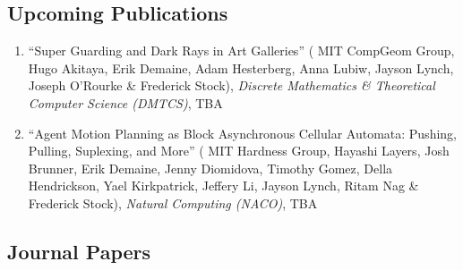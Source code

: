 \documentclass[letterpaper,11pt]{article}
\makeatletter
\newcommand{\resumeSubHeadingListStart}{\begin{itemize}[leftmargin=*]}
\newcommand{\resumeSubHeadingListEnd}{\end{itemize}}
\newcommand{\publication}[6]{
  \item ``#1'' %
   (\ignorespaces#2), %
     \emph{#3}, %
      #4%


}
\newcommand{\pdficon}{\faFilePdf}
\makeatother
\begin{document}
    \subsection*{Upcoming Publications}%
  
    \begin{enumerate}
    \setcounter{enumi}{\value{pubnum}}
      
        \publication
          {Super Guarding and Dark Rays in Art Galleries}
          {
 MIT CompGeom Group, Hugo Akitaya, Erik Demaine, Adam Hesterberg, Anna Lubiw, Jayson Lynch, Joseph O'Rourke \& Frederick Stock}
          {Discrete Mathematics \& Theoretical Computer Science (DMTCS)}
          {TBA}
          {%
%
%
%
          }
          {1}
 \vspace{-.5em}  
      
        \publication
          {Agent Motion Planning as Block Asynchronous Cellular Automata: Pushing, Pulling, Suplexing, and More}
          {
 MIT Hardness Group, Hayashi Layers, Josh Brunner, Erik Demaine, Jenny Diomidova, Timothy Gomez, Della Hendrickson, Yael Kirkpatrick, Jeffery Li, Jayson Lynch, Ritam Nag \& Frederick Stock}
          {Natural Computing (NACO)}
          {TBA}
          {%
\href{fred-stock.github.io/docstore/Push-Pull-NACO.pdf}{\pdficon}%
%
%
          }
          {2}
 
    \setcounter{pubnum}{\value{enumi}}
    \end{enumerate}
    \subsection*{Journal Papers}%
  
\end{document}
